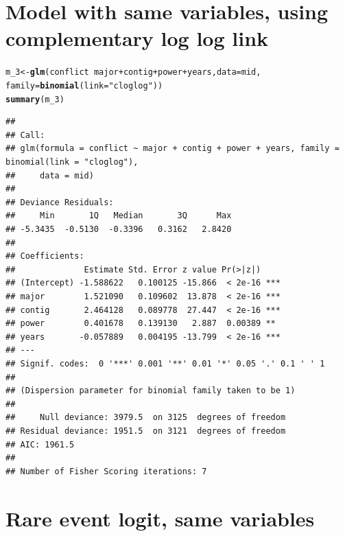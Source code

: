 \documentclass{article}\usepackage[]{graphicx}\usepackage[]{color}
\makeatletter
\newcommand{\hlstr}[1]{\textcolor[rgb]{0.192,0.494,0.8}{#1}}%
\newcommand{\hlopt}[1]{\textcolor[rgb]{0,0,0}{#1}}%
\newcommand{\hlstd}[1]{\textcolor[rgb]{0.345,0.345,0.345}{#1}}%
\newcommand{\hlkwb}[1]{\textcolor[rgb]{0.69,0.353,0.396}{#1}}%
\newcommand{\hlkwc}[1]{\textcolor[rgb]{0.333,0.667,0.333}{#1}}%
\newcommand{\hlkwd}[1]{\textcolor[rgb]{0.737,0.353,0.396}{\textbf{#1}}}%
\newenvironment{kframe}{%
 \def\at@end@of@kframe{}%
 \ifinner\ifhmode%
  \def\at@end@of@kframe{\end{minipage}}%
  \begin{minipage}{\columnwidth}%
 \fi\fi%
 \def\FrameCommand##1{\hskip\@totalleftmargin \hskip-\fboxsep
 \colorbox{shadecolor}{##1}\hskip-\fboxsep
     \hskip-\linewidth \hskip-\@totalleftmargin \hskip\columnwidth}%
 \MakeFramed {\advance\hsize-\width
   \@totalleftmargin\z@ \linewidth\hsize
   \@setminipage}}%
 {\par\unskip\endMakeFramed%
 \at@end@of@kframe}
\newenvironment{knitrout}{}{} %
\makeatother
\begin{document}
\section{Model with same variables, using complementary log log link}

\begin{knitrout}
\color{fgcolor}\begin{kframe}
\begin{alltt}
\hlstd{m_3} \hlkwb{<-} \hlkwd{glm}\hlstd{(conflict} \hlopt{~} \hlstd{major} \hlopt{+} \hlstd{contig} \hlopt{+} \hlstd{power} \hlopt{+} \hlstd{years,} \hlkwc{data} \hlstd{= mid,}
           \hlkwc{family} \hlstd{=} \hlkwd{binomial}\hlstd{(}\hlkwc{link} \hlstd{=} \hlstr{"cloglog"}\hlstd{))}
\hlkwd{summary}\hlstd{(m_3)}
\end{alltt}
\begin{verbatim}
## 
## Call:
## glm(formula = conflict ~ major + contig + power + years, family = binomial(link = "cloglog"), 
##     data = mid)
## 
## Deviance Residuals: 
##     Min       1Q   Median       3Q      Max  
## -5.3435  -0.5130  -0.3396   0.3162   2.8420  
## 
## Coefficients:
##              Estimate Std. Error z value Pr(>|z|)    
## (Intercept) -1.588622   0.100125 -15.866  < 2e-16 ***
## major        1.521090   0.109602  13.878  < 2e-16 ***
## contig       2.464128   0.089778  27.447  < 2e-16 ***
## power        0.401678   0.139130   2.887  0.00389 ** 
## years       -0.057889   0.004195 -13.799  < 2e-16 ***
## ---
## Signif. codes:  0 '***' 0.001 '**' 0.01 '*' 0.05 '.' 0.1 ' ' 1
## 
## (Dispersion parameter for binomial family taken to be 1)
## 
##     Null deviance: 3979.5  on 3125  degrees of freedom
## Residual deviance: 1951.5  on 3121  degrees of freedom
## AIC: 1961.5
## 
## Number of Fisher Scoring iterations: 7
\end{verbatim}
\end{kframe}
\end{knitrout}

\section{Rare event logit, same variables}
\end{document}
